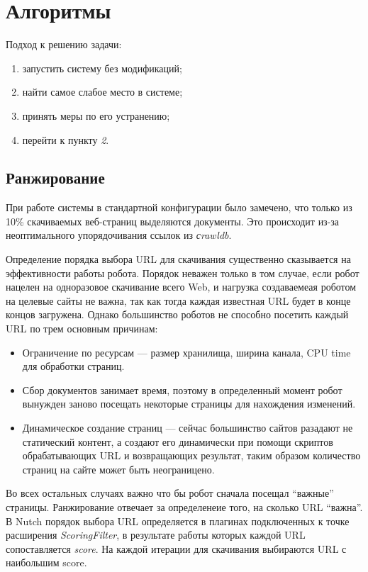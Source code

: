 \chapter{Алгоритмы}
Подход к решению задачи:
\begin{enumerate}
 \item запустить систему без модификаций;
 \item найти самое слабое место в системе;
 \item принять меры по его устранению;
 \item перейти к пункту \textit{2}.
\end{enumerate}
\section{Ранжирование}
При работе системы в стандартной конфигурации было замечено, что только из 10\% скачиваемых веб-страниц выделяются документы. Это происходит из-за неоптимального упорядочивания ссылок из \textit{сrawldb}.

Определение порядка выбора URL для скачивания существенно сказывается на эффективности работы робота.\cite{crawl}\cite{focused}\cite{opic} Порядок неважен только в том случае, если робот нацелен на одноразовое скачивание всего Web, и нагрузка создаваемеая роботом на целевые сайты не важна, так как тогда каждая известная URL будет в конце концов загружена. Однако большинство роботов не способно посетить каждый URL по трем основным причинам:
\begin{itemize}
 \item Ограничение по ресурсам --- размер хранилища, ширина канала, CPU time для обработки страниц.
 \item Сбор документов занимает время, поэтому в определенный момент робот вынужден заново посещать некоторые страницы для нахождения изменений.
 \item Динамическое создание страниц --- сейчас большинство сайтов разадают не статический контент, а создают его динамически при помощи скриптов обрабатывающих URL и возвращающих результат, таким образом количество страниц на сайте может быть неограницено.
\end{itemize}

Во всех остальных случаях важно что бы робот сначала посещал ``важные'' страницы. Ранжирование отвечает за определенеие того, на сколько URL ``важна''.
В Nutch порядок выбора URL определяется в плагинах подключенных к точке расширения \textit{ScoringFilter}, в результате работы которых каждой URL сопоставляется \textit{score}. На каждой итерации для скачивания выбираются URL с наибольшим score.

